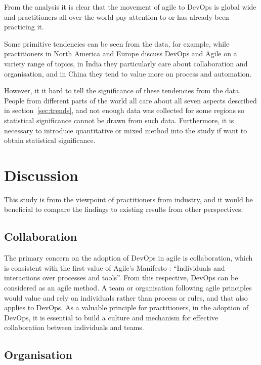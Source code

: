 \documentclass[
  12pt,
  a4paper,
]{article}
\begin{document}
From the analysis it is clear that the movement of agile to DevOps is
global wide and practitioners all over the world pay attention to or has
already been practicing it.

Some primitive tendencies can be seen from the data, for example, while
practitioners in North America and Europe discuss DevOps and Agile on a
variety range of topics, in India they particularly care about
collaboration and organisation, and in China they tend to value more on
process and automation.

However, it it hard to tell the significance of these tendencies from
the data. People from different parts of the world all care about all
seven aspects described in section~\ref{sec:trends}, and not enough data
was collected for some regions so statistical significance cannot be
drawn from such data. Furthermore, it is necessary to introduce
quantitative or mixed method into the study if want to obtain
statistical significance.

\hypertarget{sec:discu}{%
\section{Discussion}\label{sec:discu}}

This study is from the viewpoint of practitioners from industry, and it
would be beneficial to compare the findings to existing results from
other perspectives.

\hypertarget{collaboration}{%
\subsection{Collaboration}\label{collaboration}}

The primary concern on the adoption of DevOps in agile is collaboration,
which is consistent with the first value of Agile's Manifesto
\citep{beck:2001:agile-Manifesto}: ``Individuals and interactions over
processes and tools''. From this respective, DevOps can be considered as
an agile method. A team or organisation following agile principles would
value and rely on individuals rather than process or rules, and that
also applies to DevOps. As a valuable principle for practitioners, in
the adoption of DevOps, it is essential to build a culture and mechanism
for effective collaboration between individuals and teams.

\hypertarget{organisation}{%
\subsection{Organisation}\label{organisation}}
\end{document}
